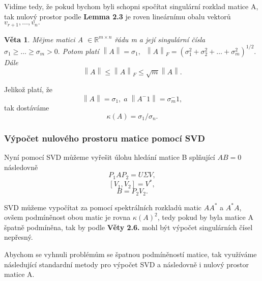 \documentclass{article}
\theoremstyle{plain}
\newtheorem{veta}{Věta}[section]
\theoremstyle{definition}
\begin{document}
Vidíme tedy, že pokud bychom byli schopni spočítat singulární rozklad matice A, tak nulový prostor podle \textbf{Lemma 2.3} je roven lineárnímu obalu vektorů $v_{r+1},\hdots,v_n.$
\newpage

\begin{veta}
    Mějme matici A $\in \mathbb{R}^{m \times n}$ řádu m a její singulární čísla $\sigma_1\geq\hdots\geq\sigma_m>0.$
Potom platí $\left \lVert A \right \rVert = \sigma_1,\;\;
\left \lVert A \right \rVert _F = (\sigma_1^2+\sigma_2^2+\hdots+\sigma_m^2)^{1/2}.$
Dále
$$\left \lVert A \right \rVert \leq \left \lVert A \right \rVert _F \leq \sqrt{m} \left \lVert A \right \rVert.$$
\end{veta}
Jelikož platí, že $$\left \lVert A \right \rVert = \sigma_1,\;a\; \left \lVert A^-1 \right \rVert = \sigma_m^-1,$$
tak dostáváme
$$\kappa(A)=\sigma_1 / \sigma_n.$$

\subsubsection{Výpočet nulového prostoru matice pomocí SVD}

Nyní pomocí SVD můžeme vyřešit úlohu hledání matice B splňující $AB=0$ následovně
$$P_1AP_2=U\Sigma V,$$
$$[V_1,V_2]=V^*,$$
$$B=P_2V_2.$$

SVD můžeme vypočítat za pomocí spektrálních rozkladů matic $AA^*$ a $A^*A$, ovšem podmíněnost obou matic je rovna $\kappa(A)^2$, tedy pokud by byla matice A špatně podmíněna, tak by podle \textbf{Věty 2.6.} mohl být výpočet singulárních čísel nepřesný.

Abychom se vyhnuli problémům se špatnou podmíněností matice, tak využíváme následující standardní metody pro výpočet SVD a následovně i nulový prostor matice A.
\end{document}
